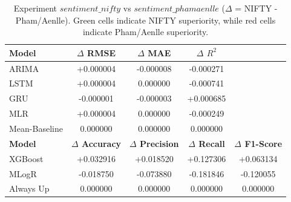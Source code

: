 \documentclass[Master,english,IEEE]{twbook}
\begin{document}
\begin{table}[H]
    \centering
    \small
    \setlength{\tabcolsep}{4pt}
    \begin{tabular}{|lcccc|}
        \hline
        \textbf{Model} & \textbf{$\Delta$ RMSE} & \textbf{$\Delta$ MAE} & \textbf{$\Delta$ $R^2$} & \\
        \hline
        ARIMA          & \cellcolor{red!25}+0.000004    & \cellcolor{green!25}-0.000008  & \cellcolor{red!25}-0.000271    & \\
        LSTM           & \cellcolor{red!25}+0.000004    &  0.000000                      & \cellcolor{red!25}-0.000741    & \\
        GRU            & \cellcolor{green!25}-0.000001  & \cellcolor{green!25}-0.000003  & \cellcolor{green!25}+0.000685  & \\
        MLR            & \cellcolor{red!25}+0.000004    &  0.000000                      & \cellcolor{red!25}-0.000249    & \\
        Mean-Baseline  &  0.000000                      &  0.000000                      &  0.000000                      & \\
        \hline
        \textbf{Model} & \textbf{$\Delta$ Accuracy} & \textbf{$\Delta$ Precision} & \textbf{$\Delta$ Recall} & \textbf{$\Delta$ F1-Score} \\
        \hline
        XGBoost        & \cellcolor{green!25}+0.032916  & \cellcolor{green!25}+0.018520 & \cellcolor{green!25}+0.127306 & \cellcolor{green!25}+0.063134   \\
        MLogR          & \cellcolor{red!25}-0.018750    & \cellcolor{red!25}-0.073880   & \cellcolor{red!25}-0.181846   & \cellcolor{red!25}-0.120055 \\
        Always Up      &  0.000000                      &  0.000000                     &  0.000000                     &  0.000000                     \\
        \hline
    \end{tabular}
    \caption{Experiment $sentiment\_nifty$ vs $sentiment\_phamaenlle$ ($\Delta$ = NIFTY - Pham/Aenlle). Green cells indicate NIFTY superiority, while red cells indicate Pham/Aenlle superiority.}
    \label{tab:nifty_vs_phamaenlle}
\end{table}
\end{document}
